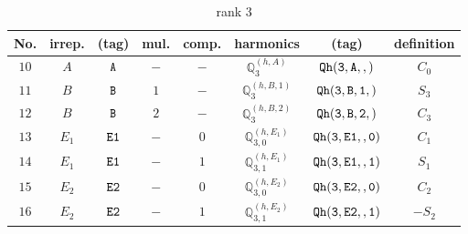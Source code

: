\documentclass[fleqn,8pt]{jsarticle}
\begin{document}
\begin{table}[ht!]
\begin{center}
\caption{rank 3}
\renewcommand{\arraystretch}{1.3}
\begin{tabular}{cccccccc} \hline \hline
No. & irrep. & (tag) & mul. & comp. & harmonics & (tag) & definition \\ \hline
$ 10 $ & $ A $ & $ {\tt A} $ & $ - $ & $ - $ & $ \mathbb{Q}_{3}^{(h,A)} $ & $ {\tt Qh(3,A,,)} $ & $ C_{0} $ \\
$ 11 $ & $ B $ & $ {\tt B} $ & $ 1 $ & $ - $ & $ \mathbb{Q}_{3}^{(h,B,1)} $ & $ {\tt Qh(3,B,1,)} $ & $ S_{3} $ \\
$ 12 $ & $ B $ & $ {\tt B} $ & $ 2 $ & $ - $ & $ \mathbb{Q}_{3}^{(h,B,2)} $ & $ {\tt Qh(3,B,2,)} $ & $ C_{3} $ \\
$ 13 $ & $ E_{1} $ & $ {\tt E1} $ & $ - $ & $ 0 $ & $ \mathbb{Q}_{3,0}^{(h,E_{1})} $ & $ {\tt Qh(3,E1,,0)} $ & $ C_{1} $ \\
$ 14 $ & $ E_{1} $ & $ {\tt E1} $ & $ - $ & $ 1 $ & $ \mathbb{Q}_{3,1}^{(h,E_{1})} $ & $ {\tt Qh(3,E1,,1)} $ & $ S_{1} $ \\
$ 15 $ & $ E_{2} $ & $ {\tt E2} $ & $ - $ & $ 0 $ & $ \mathbb{Q}_{3,0}^{(h,E_{2})} $ & $ {\tt Qh(3,E2,,0)} $ & $ C_{2} $ \\
$ 16 $ & $ E_{2} $ & $ {\tt E2} $ & $ - $ & $ 1 $ & $ \mathbb{Q}_{3,1}^{(h,E_{2})} $ & $ {\tt Qh(3,E2,,1)} $ & $ - S_{2} $ \\
 \hline \hline
\end{tabular}
\end{center}
\end{table}
\end{document}
